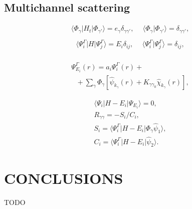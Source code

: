 \documentclass[aip
, pra
, showpacs
, aps
, twocolumn
, groupedaddress
, floatfix
]{revtex4}
\newcommand{\beq}{\begin{equation}}
\newcommand{\eeq}{\end{equation}}
\newcommand{\barr}{\begin{array}}
\newcommand{\earr}{\end{array}}
\begin{document}
\subsection{Multichannel scattering}
\beq \barr{ll}
\langle \Phi_\gamma|H_t|\Phi_{\gamma'}\rangle=e_\gamma \delta_{\gamma\gamma'}, \ \
& \langle \Phi_\gamma|\Phi_{\gamma'}\rangle=\delta_{\gamma\gamma'},\\
\earr \label{psi_H_psi} \eeq
\beq \barr{ll}
\langle\Psi_i^\Gamma|H|\Psi_j^\Gamma\rangle=E_i\delta_{ij}, \ \
& \langle\Psi_i^\Gamma|\Psi_j^\Gamma\rangle=\delta_{ij},\\
\earr \label{Psi_H_Psi_JM} \eeq


\beq \barr{l}
\Psi_{E_i}^{\Gamma}(r) = a_i \Psi_i^\Gamma(r) + \\  
\ \ \ + \sum_{\gamma} \Phi_{\gamma} [ \hat{\psi}_{k_\gamma}(r)  
 +  K_{\gamma \gamma_0}  \hat{\chi}_{k_\gamma}(r)],
\earr \label{Psi_EES} \eeq


\beq \barr{l}
\langle\Psi_i|H-E_i|\Psi_{E_i}\rangle=0,\\
R_{\gamma \gamma} = - S_i / C_i, \\
S_i = \langle\Psi_i^{\Gamma}|H-E_i|   \Phi_{\gamma} \hat{\psi}_1 \rangle, \\
C_i = \langle\Psi_i^{\Gamma}|H-E_i|  \hat{\psi}_2 \rangle.
\earr \eeq


\section{CONCLUSIONS}
TODO


\begin{acknowledgments}
\end{acknowledgments}





%
\end{document}
